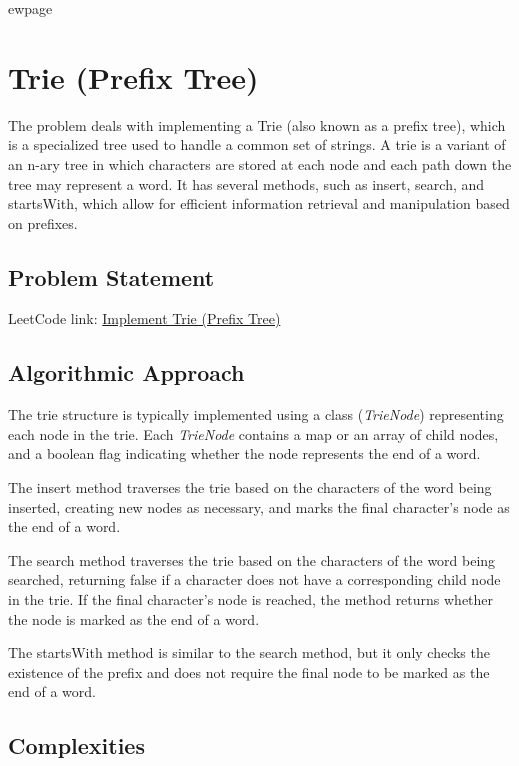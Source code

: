 
ewpage

\chapter{Trie (Prefix Tree)}
\label{chap:trie_prefix_tree}

The problem deals with implementing a Trie (also known as a prefix tree), which is a specialized tree used to handle a common set of strings. A trie is a variant of an n-ary tree in which characters are stored at each node and each path down the tree may represent a word. It has several methods, such as insert, search, and startsWith, which allow for efficient information retrieval and manipulation based on prefixes.

\section*{Problem Statement}

LeetCode link: \href{https://leetcode.com/problems/implement-trie-prefix-tree/}{Implement Trie (Prefix Tree)}

\section*{Algorithmic Approach}

The trie structure is typically implemented using a class (\textit{TrieNode}) representing each node in the trie. Each \textit{TrieNode} contains a map or an array of child nodes, and a boolean flag indicating whether the node represents the end of a word.

The insert method traverses the trie based on the characters of the word being inserted, creating new nodes as necessary, and marks the final character's node as the end of a word.

The search method traverses the trie based on the characters of the word being searched, returning false if a character does not have a corresponding child node in the trie. If the final character's node is reached, the method returns whether the node is marked as the end of a word.

The startsWith method is similar to the search method, but it only checks the existence of the prefix and does not require the final node to be marked as the end of a word.

\section*{Complexities}

